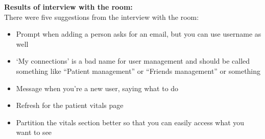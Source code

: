 \documentclass[12pt]{article}
\begin{document}
{\textbf{Results of interview with the room: } \\
There were five suggestions from the interview with the room: 
\begin{itemize}
	\item Prompt when adding a person asks for an email, but you can use username as well
	\item ‘My connections’ is a bad name for user management and should be called something like “Patient management” or “Friends management” or something
	\item Message when you’re a new user, saying what to do
	\item Refresh for the patient vitals page
	\item Partition the vitals section better so that you can easily access what you want to see
\end{itemize}	

}
\end{document}

